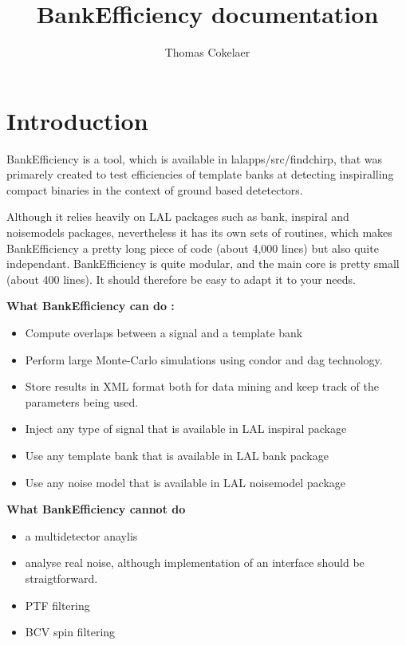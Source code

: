 \documentclass[a4paper,10pt]{article}
\title{BankEfficiency documentation}
\author{Thomas Cokelaer}
\begin{document}

\pagestyle{plain}
\rfoot{}
\lfoot{}
\pagestyle{plain}



\maketitle
\section{Introduction}

BankEfficiency is a tool, which is available in lalapps/src/findchirp, that was primarely created to test efficiencies of template banks at detecting inspiralling compact binaries in the context of ground based detetectors. 

Although it relies heavily on LAL packages such as bank, inspiral and noisemodels packages, nevertheless it has its own sets of routines, which makes BankEfficiency a pretty long piece of code (about 4,000 lines) but also quite independant. BankEfficiency is quite modular, and the main core is pretty small (about 400 lines). It should therefore be easy to adapt it to your needs. 

\textbf{What BankEfficiency can do :}
\begin{itemize}
 \item Compute overlaps between a signal and a template bank
 \item Perform large Monte-Carlo simulations using condor and dag technology.
 \item Store results in XML format both for data mining and keep track of the parameters being used.
 \item Inject any type of signal that is available in LAL inspiral package
 \item Use any template bank that is available in LAL bank package
 \item Use any noise model that is available in LAL noisemodel package
\end{itemize}

\textbf{What BankEfficiency cannot do }
\begin{itemize}
 \item a multidetector anaylis
 \item analyse real noise, although implementation of an interface should be straigtforward.
 \item PTF filtering
 \item BCV spin filtering
\end{itemize}
\end{document}
